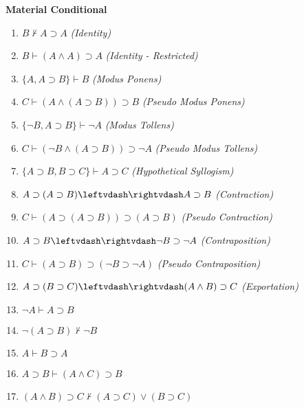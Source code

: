 
\noindent \textbf{Material Conditional}

\begin{enumerate}
\setcounter{enumi}{\value{enumi_saved}}
\item $ B\nvdash  A \supset  A $\hfill\emph{ (Identity)}  
\item $ B\vdash  (A \wedge  A) \supset  A $\hfill\emph{ (Identity - Restricted)}  
\item $ \{A, A \supset  B \} \vdash  B $\hfill\emph{ (Modus Ponens)}  
\item $ C\vdash  (A \wedge  (A \supset  B)) \supset  B $\hfill\emph{ (Pseudo Modus Ponens)}  
\item $ \{\neg B, A \supset  B \} \vdash  \neg A $\hfill\emph{ (Modus Tollens)}  
\item $ C\vdash  (\neg B \wedge  (A \supset  B)) \supset  \neg A $\hfill\emph{ (Pseudo Modus Tollens)}  
\item $ \{A \supset  B, B \supset  C \} \vdash  A \supset  C $\hfill\emph{ (Hypothetical Syllogism)}  
\item $ A \supset  (A \supset  B)\leftvdash\rightvdash  A \supset  B $ \hfill\emph{ (Contraction)}  
\item $ C\vdash  (A \supset  (A \supset  B)) \supset  (A \supset  B) $\hfill\emph{ (Pseudo Contraction)}  
\item $ A \supset  B\leftvdash\rightvdash  \neg B \supset  \neg A $ \hfill\emph{ (Contraposition)}  
\item $ C\vdash  (A \supset  B) \supset  (\neg B \supset  \neg A) $\hfill\emph{ (Pseudo Contraposition)}  
\item $ A \supset  (B \supset  C)\leftvdash\rightvdash  (A \wedge  B) \supset  C $ \hfill\emph{ (Exportation)}  
\item $ \neg A\vdash  A \supset  B $\hfill\emph{ }  
\item $ \neg (A \supset  B)\nvdash  \neg B $\hfill\emph{ }  
\item $ A\vdash  B \supset  A $\hfill\emph{ }  
\item $ A \supset  B\vdash  (A \wedge  C) \supset  B $\hfill\emph{ }  
\item $ (A \wedge  B) \supset  C\nvdash  (A \supset  C) \vee  (B \supset  C) $\hfill\emph{ }  
\setcounter{enumi_saved}{\value{enumi}}
\end{enumerate}






